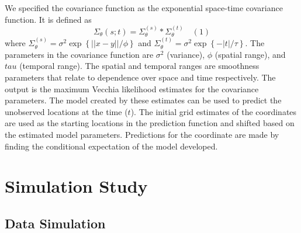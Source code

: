 \documentclass[12pt]{article}
\begin{document}
We specified the covariance function as the exponential space-time
covariance function. It is defined as
\[\Sigma_{\theta}(s;t) = \Sigma^{(s)}_{\theta}*\Sigma^{(t)}_{\theta} \quad (1)\]
where
\(\Sigma^{(s)}_{\theta} = \sigma^2\exp\left\{||x-y||/\phi\right\}\) and
\(\Sigma^{(t)}_{\theta} = \sigma^2\exp\left\{-|t|/\tau\right\}\). The
parameters in the covariance function are \(\sigma^2\) (variance),
\(\phi\) (spatial range), and \(tau\) (temporal range). The spatial and
temporal ranges are smoothness parameters that relate to dependence over
space and time respectively. The output is the maximum Vecchia
likelihood estimates for the covariance parameters. The model created by
these estimates can be used to predict the unobserved locations at the
time (\(t\)). The initial grid estimates of the coordinates are used as
the starting locations in the prediction function and shifted based on
the estimated model parameters. Predictions for the coordinate are made
by finding the conditional expectation of the model developed.

\hypertarget{simulation}{%
\section{Simulation Study}\label{simulation}}

\hypertarget{data-simulation}{%
\subsection{Data Simulation}\label{data-simulation}}
\end{document}
